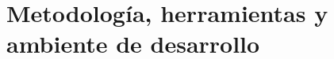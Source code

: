 \chapter{Metodología, herramientas y ambiente de desarrollo}
\label{ch:metodologia_herramientas_ambiente}






